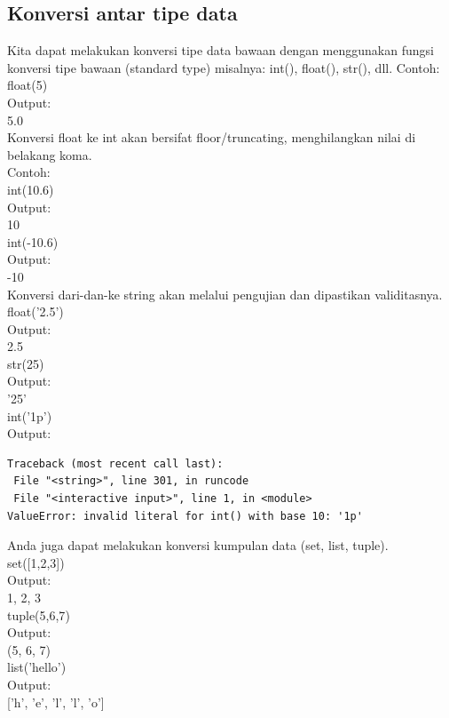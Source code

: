 \subsection{Konversi antar tipe data}
Kita dapat melakukan konversi tipe data bawaan dengan menggunakan fungsi konversi tipe bawaan (standard type) misalnya: int(), float(), str(), dll.
Contoh:\\
float(5)\\
Output:\\
5.0\\
Konversi float ke int akan bersifat floor/truncating, menghilangkan nilai di belakang koma.\\
Contoh:\\
int(10.6)\\
Output:\\
10\\
int(-10.6)\\
Output:\\
-10\\
Konversi dari-dan-ke string akan melalui pengujian dan dipastikan validitasnya.\\
float('2.5')\\
Output:\\
2.5\\
str(25)\\
Output:\\
'25'\\
int('1p')\\
Output:
\begin{verbatim}
Traceback (most recent call last):
 File "<string>", line 301, in runcode
 File "<interactive input>", line 1, in <module>
ValueError: invalid literal for int() with base 10: '1p'
\end{verbatim}

Anda juga dapat melakukan konversi kumpulan data (set, list, tuple).\\
set([1,2,3])\\
Output:\\

{1, 2, 3}\\
tuple({5,6,7})\\
Output:\\

(5, 6, 7)\\
list('hello')\\
Output:\\

['h', 'e', 'l', 'l', 'o']\\

